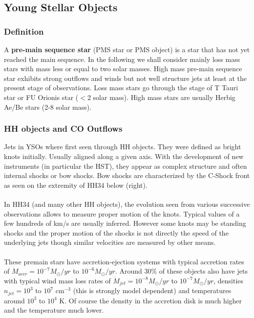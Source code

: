 \documentclass[10pt,a4paper]{article}
\begin{document}
\subsection{Young Stellar Objects}
\subsubsection{Definition}
A \textbf{pre-main sequence star} (PMS star or PMS object) is a star that has not yet reached the main sequence. In the following we shall consider mainly loss mass stars with mass less or equal to two solar masses. High mass pre-main sequence star exhibits strong outflows and winds but not well structure jets at least at the present stage of observations. Loss mass stars go through the stage of T Tauri star or FU Orionis star ($<2$ solar mass). High mass stars are usually Herbig Ae/Be stars (2-8 solar mass).
\subsubsection{HH objects and CO Outflows}
Jets in YSOs where first seen through HH objects. They were defined as bright knots initially. Usually aligned along a given axis. With the development of new instruments (in particular the HST), they appear as complex structure and often internal shocks or bow shocks. Bow shocks are characterized by the C-Shock front as seen on the extremity of HH34 below (right).\\
\\
In HH34 (and many other HH objects), the evolution seen from various successive observations allows to measure proper motion of the knots. Typical values of a few hundreds of km/s are usually inferred. However some knots may be standing shocks and the proper motion of the shocks is not directly the speed of the underlying jets though similar velocities are measured by other means.\\
\\
These premain stars have accretion-ejection systems with typical accretion rates of $\dot{M}_{accr}=10^{-7}M_{\odot} /yr$ to $10^{-6}M_{\odot} /yr$. Around $30\%$ of these objects also have jets with typical wind mass loss rates of $\dot{M}_{jet}=10^{-8}M_{\odot} /yr$ to $10^{-7}M_{\odot} /yr$, densities $n_{jet}=10^3$ to $10^7$ cm$^{-3}$ (this is strongly model dependent) and temperatures around $10^3$ to $10^4$ K. Of course the density in the accretion disk is much higher and the temperature much lower.
\end{document}

